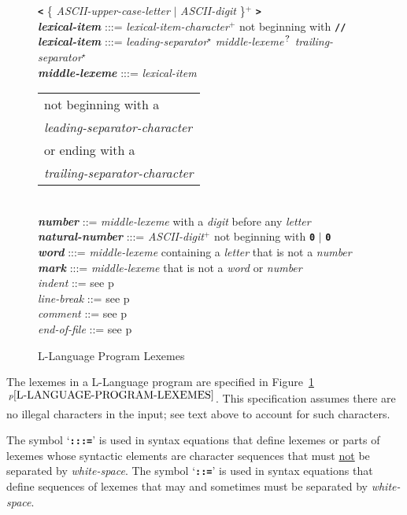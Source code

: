 \documentclass[12pt]{article}
\newcommand{\TT}[1]{{\tt \bfseries #1}}
\newcommand{\STAR}{{\Large $^\star$}}
\newcommand{\PLUS}[1][]{{$^{+#1}$}}
\newcommand{\QMARK}{{$^{\,\mbox{\footnotesize ?}}$}}
\newcommand{\ttkey}[1]{{\tt \bfseries #1}}
\newcommand{\emkey}[1]{{\em \bfseries #1}}
\newcommand{\itemref}[1]{\ref{#1}$\,^{p\pageref{#1}}$}
\newcommand{\pagref}[1]{p\pageref{#1}}
\newlength{\figurewidth}
\newenvironment{boxedfigure}[1][!btp]%
	{\begin{figure*}[#1]
	 \begin{lrbox}{\figurebox}
	 \begin{minipage}{\figurewidth}

	 \vspace*{1ex}}%
	{
	 \vspace*{1ex}

	 \end{minipage}
	 \end{lrbox}

	 \centering
	 \fbox{\hspace*{0.1in}\usebox{\figurebox}\hspace*{0.1in}}
	 \end{figure*}}
\newenvironment{indpar}[1][0.3in]%
	{\begin{list}{}%
		     {\setlength{\itemsep}{0in}%
		      \setlength{\topsep}{0in}%
		      \setlength{\parsep}{1ex}%
		      \setlength{\labelwidth}{#1}%
		      \setlength{\leftmargin}{#1}%
		      \addtolength{\leftmargin}{\labelsep}}%
	 \item}%
	{\end{list}}
\begin{document}
\begin{boxedfigure}[!p]
\begin{indpar}
\hspace*{0.5in}
    \TT{<} \{ {\em ASCII-upper-case-letter} $|$ {\em ASCII-digit}
            \}\PLUS{} \TT{>}
\\[1ex]
\emkey{lexical-item} :::= {\em lexical-item-character}\PLUS{}
                       not beginning with \TT{//}
\\[0.5ex]
\emkey{lexical-item} :::= {\em leading-separator}\STAR{}
			  {\em middle-lexeme}\QMARK{}
                          {\em trailing-separator}\STAR{}
\\[0.5ex]
\emkey{middle-lexeme} :::= 
	{\em lexical-item}
	\begin{tabular}[t]{@{}l@{}}
	not beginning with a \\
	{\em leading-separator-character} \\
	or ending with a \\
	{\em trailing-separator-character} \\
	\end{tabular}
\\[0.5ex]
\emkey{number}
    ::= {\em middle-lexeme} with a {\em digit} before any {\em letter}
\\[0.5ex]
\emkey{natural-number}\label{NATURAL-NUMBER}
	:::= {\em ASCII-digit}\PLUS{} not beginning with \TT{0} $|$ \TT{0}
\\[0.5ex]
\emkey{word} :::= {\em middle-lexeme} containing a {\em letter} that is not
                  a {\em number}
\\[0.5ex]
\emkey{mark} :::= {\em middle-lexeme} that is not a {\em word} or
		  {\em number}
\\[0.5ex]
{\em indent} ::= see \pagref{INDENT}
\\[0.5ex]
{\em line-break} ::= see \pagref{LINE-BREAK}
\\[0.5ex]
{\em comment} ::= see \pagref{COMMENT}
\\[0.5ex]
{\em end-of-file} ::= see \pagref{END-OF-FILE}

\end{indpar}
\caption{L-Language Program Lexemes}
\label{L-LANGUAGE-PROGRAM-LEXEMES}
\end{boxedfigure}

The lexemes in a L-Language program are specified in
Figure~\itemref{L-LANGUAGE-PROGRAM-LEXEMES}.  This specification assumes there
are no illegal characters in the input; see text
above to account for such characters.

The symbol `\ttkey{:::=}' is used in syntax equations
that define lexemes or parts of lexemes whose syntactic elements are
character sequences that must \underline{not} be separated by {\em white-space}.
The symbol `\ttkey{::=}'
is used in syntax equations that define sequences of lexemes that may
and sometimes must be separated by {\em white-space}.
\end{document}
